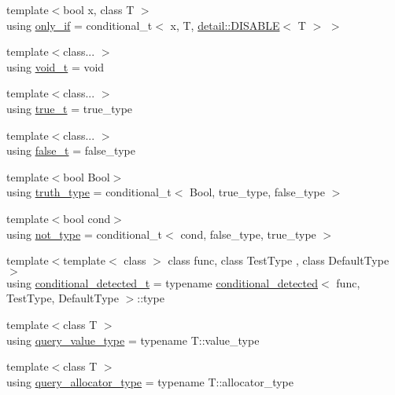 \begin{DoxyCompactItemize}
\item 
{\footnotesize template$<$bool x, class T $>$ }\\using \hyperlink{namespacebc_1_1traits_acd61b56f095b67b85ccbe21d8bb1cd8d}{only\+\_\+if} = conditional\+\_\+t$<$ x, T, \hyperlink{structbc_1_1traits_1_1detail_1_1DISABLE}{detail\+::\+D\+I\+S\+A\+B\+LE}$<$ T $>$ $>$
\item 
{\footnotesize template$<$class... $>$ }\\using \hyperlink{namespacebc_1_1traits_a41800b73eece865ca4b2b2faaac9974a}{void\+\_\+t} = void
\item 
{\footnotesize template$<$class... $>$ }\\using \hyperlink{namespacebc_1_1traits_a5753b5335a2644153a1e6a98209b0b22}{true\+\_\+t} = true\+\_\+type
\item 
{\footnotesize template$<$class... $>$ }\\using \hyperlink{namespacebc_1_1traits_a8742be07ccb2e54481314368169dd551}{false\+\_\+t} = false\+\_\+type
\item 
{\footnotesize template$<$bool Bool$>$ }\\using \hyperlink{namespacebc_1_1traits_ac91a9795000ae7f483efbaf74c9872e8}{truth\+\_\+type} = conditional\+\_\+t$<$ Bool, true\+\_\+type, false\+\_\+type $>$
\item 
{\footnotesize template$<$bool cond$>$ }\\using \hyperlink{namespacebc_1_1traits_a27454511d91930df60d099d9afdf46ff}{not\+\_\+type} = conditional\+\_\+t$<$ cond, false\+\_\+type, true\+\_\+type $>$
\item 
{\footnotesize template$<$template$<$ class $>$ class func, class Test\+Type , class Default\+Type $>$ }\\using \hyperlink{namespacebc_1_1traits_a1a6d378947ec32acd457890854bcd592}{conditional\+\_\+detected\+\_\+t} = typename \hyperlink{structbc_1_1traits_1_1conditional__detected}{conditional\+\_\+detected}$<$ func, Test\+Type, Default\+Type $>$\+::type
\item 
{\footnotesize template$<$class T $>$ }\\using \hyperlink{namespacebc_1_1traits_a40b9437a2ec1bb34ee7d506c8053f906}{query\+\_\+value\+\_\+type} = typename T\+::value\+\_\+type
\item 
{\footnotesize template$<$class T $>$ }\\using \hyperlink{namespacebc_1_1traits_ab141f0cc8348b4b7ebcb48e6bbb50d09}{query\+\_\+allocator\+\_\+type} = typename T\+::allocator\+\_\+type

\end{DoxyCompactItemize}
